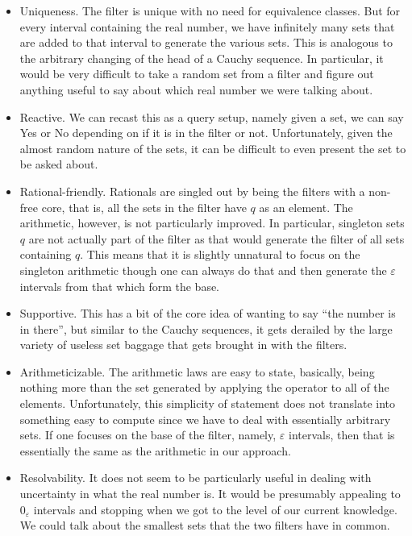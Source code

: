 \documentclass[12pt]{article}
\theoremstyle{remark}
\begin{document}
\begin{itemize}
    \item Uniqueness. The filter is unique with no need for equivalence classes. But for every interval containing the real number, we have infinitely many sets that are added to that interval to generate the various sets. This is analogous to the arbitrary changing of the head of a Cauchy sequence. In particular, it would be very difficult to take a random set from a filter and figure out anything useful to say about which real number we were talking about.
    \item Reactive. We can recast this as a query setup, namely given a set, we can say Yes or No depending on if it is in the filter or not. Unfortunately, given the almost random nature of the sets, it can be difficult to even present the set to be asked about. 
    \item Rational-friendly. Rationals are singled out by being the filters with a non-free core, that is, all the sets in the filter have $q$ as an element. The arithmetic, however, is not particularly improved. In particular, singleton sets $q$ are not actually part of the filter as that would generate the filter of all sets containing $q$. This means that it is slightly unnatural to focus on the singleton arithmetic though one can always do that and then generate the $\varepsilon$ intervals from that which form the base. 
    \item Supportive. This has a bit of the core idea of wanting to say ``the number is in there'', but similar to the Cauchy sequences, it gets derailed by the large variety of useless set baggage that gets brought in with the filters. 
    \item Arithmeticizable. The arithmetic laws are easy to state, basically, being nothing more than the set generated by applying the operator to all of the elements. Unfortunately, this simplicity of statement does not translate into something easy to compute since we have to deal with essentially arbitrary sets. If one focuses on the base of the filter, namely, $\varepsilon$ intervals, then that is essentially the same as the arithmetic in our approach. 
    \item Resolvability. It does not seem to be particularly useful in dealing with uncertainty in what the real number is. It would be presumably appealing to $0_{\varepsilon}$ intervals and stopping when we got to the level of our current knowledge. We could talk about the smallest sets that the two filters have in common. 
\end{itemize}
\end{document}

